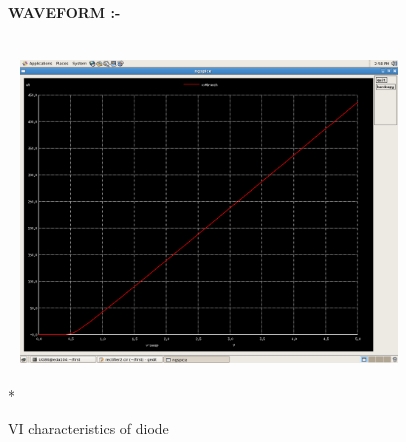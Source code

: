 \documentclass{article}
\begin{document}
\begin{flushleft}
\begin{figure}[ht] 
\large{{\bf\textcolor{rosewood}{ WAVEFORM} :-}}\vspace{5mm} \\*
\includegraphics[width=10cm, height=10cm]{diode.png} 
\caption{VI characteristics of diode}
\label{fig:circuit2} 
\end{figure} 
\end{flushleft}
\newpage
\end{document}
